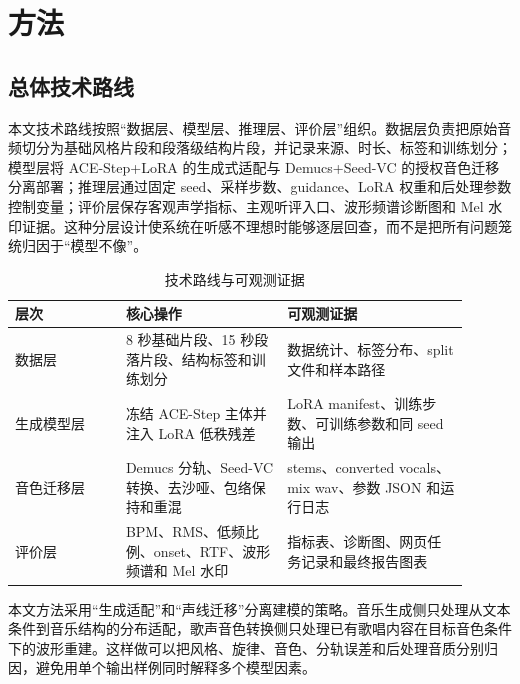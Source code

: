 \documentclass[UTF8,a4paper,zihao=-4,fontset=none]{ctexart}
\begin{document}
\section{方法}
\subsection{总体技术路线}
本文技术路线按照“数据层、模型层、推理层、评价层”组织。数据层负责把原始音频切分为基础风格片段和段落级结构片段，并记录来源、时长、标签和训练划分；模型层将 ACE-Step+LoRA 的生成式适配与 Demucs+Seed-VC 的授权音色迁移分离部署；推理层通过固定 seed、采样步数、guidance、LoRA 权重和后处理参数控制变量；评价层保存客观声学指标、主观听评入口、波形频谱诊断图和 Mel 水印证据。这种分层设计使系统在听感不理想时能够逐层回查，而不是把所有问题笼统归因于“模型不像”。

\begin{table}[H]
\centering
\caption{技术路线与可观测证据}
\small
\begin{tabular}{p{0.22\linewidth}p{0.32\linewidth}p{0.36\linewidth}}
\toprule
层次 & 核心操作 & 可观测证据 \\
\midrule
数据层 & 8 秒基础片段、15 秒段落片段、结构标签和训练划分 & 数据统计、标签分布、split 文件和样本路径 \\
生成模型层 & 冻结 ACE-Step 主体并注入 LoRA 低秩残差 & LoRA manifest、训练步数、可训练参数和同 seed 输出 \\
音色迁移层 & Demucs 分轨、Seed-VC 转换、去沙哑、包络保持和重混 & stems、converted vocals、mix wav、参数 JSON 和运行日志 \\
评价层 & BPM、RMS、低频比例、onset、RTF、波形频谱和 Mel 水印 & 指标表、诊断图、网页任务记录和最终报告图表 \\
\bottomrule
\end{tabular}
\end{table}
本文方法采用“生成适配”和“声线迁移”分离建模的策略。音乐生成侧只处理从文本条件到音乐结构的分布适配，歌声音色转换侧只处理已有歌唱内容在目标音色条件下的波形重建。这样做可以把风格、旋律、音色、分轨误差和后处理音质分别归因，避免用单个输出样例同时解释多个模型因素。
\end{document}
